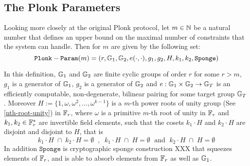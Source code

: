 \subsection{The Plonk Parameters}
Looking more closely at the original Plonk protocol, let $m\in \mathbb{N}$ be a natural number that defines an upper bound on the maximal number of constraints that the system can handle. Then  for $m$ are given by the following set:
\begin{equation}
\label{plonk-parameters}
\mathtt{Plonk-Param}(m)=(r, \mathbb{G}_1, \mathbb{G}_2, e(\cdot,\cdot), g_1,g_2, H, k_1,k_2, \mathtt{Sponge})
\end{equation}

In this definition, $\mathbb{G}_1$ and $\mathbb{G}_2$ are finite cyclic groups of order $r$ for some $r> m$, $g_1$ is a generator of $\mathbb{G}_1$, $g_2$ is a generator of $\mathbb{G}_2$ and $e: \mathbb{G}_1 \times \mathbb{G}_2 \to \mathbb{G}_T$ is an efficiently computable, non-degenerate, bilinear pairing for some target group $\mathbb{G}_T$. Moreover $H:=\{1,\omega,\omega^2,\ldots, \omega^{k-1}\}$ is a $m$-th power roots of unity group (See \ref{nth-root-unity}) in $\mathbb{F}_r$, where $\omega$ is a primitive $m$-th root of unity in $\mathbb{F}_r$ and $k_1, k_2\in \mathbb{F}^*_r$ are invertible field elements, such that the cosets $k_1\cdot H$ and $k_2\cdot H$ are disjoint and disjoint to $H$, that is
\begin{equation}
k_1\cdot H \;\cap\; k_2\cdot H = \emptyset \;\;,\;\; 
k_1\cdot H \;\cap \; H = \emptyset \;\text{  and  }\;
k_2\cdot H \;\cap \;H = \emptyset
\end{equation}
In addition $\mathtt{Sponge}$ is cryptographic sponge construction XXX that squeezes elements of $\mathbb{F}_r$, and is able to absorb elements from $\mathbb{F}_r$ as well as $\mathbb{G}_1$.
